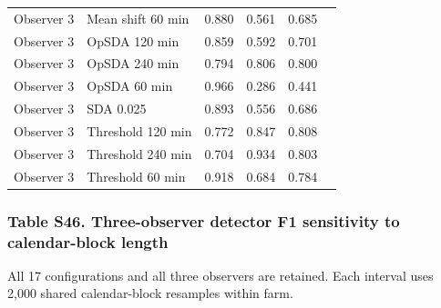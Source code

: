 \documentclass[a4paper,11pt]{article}
\begin{document}
{\begin{longtable}[]{@{}llrrrl@{}}
Observer 3 & Mean shift 60 min & 0.880 & 0.561 & 0.685 & \\
Observer 3 & OpSDA 120 min & 0.859 & 0.592 & 0.701 & \\
Observer 3 & OpSDA 240 min & 0.794 & 0.806 & 0.800 & \\
Observer 3 & OpSDA 60 min & 0.966 & 0.286 & 0.441 & \\
Observer 3 & SDA 0.025 & 0.893 & 0.556 & 0.686 & \\
Observer 3 & Threshold 120 min & 0.772 & 0.847 & 0.808 & \\
Observer 3 & Threshold 240 min & 0.704 & 0.934 & 0.803 & \\
Observer 3 & Threshold 60 min & 0.918 & 0.684 & 0.784 & \\
\end{longtable}
}

\subsubsection{Table S46. Three-observer detector F1 sensitivity to calendar-block length}\label{table-s46.-three-observer-detector-f1-sensitivity-to-calendar-block-length}

All 17 configurations and all three observers are retained. Each interval uses 2,000 shared calendar-block resamples within farm.
\end{document}
